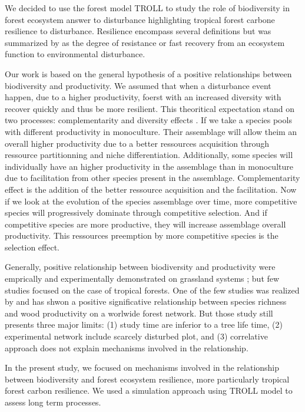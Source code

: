 \documentclass[12pt,]{article}
\theoremstyle{definition}
\theoremstyle{definition}
\theoremstyle{remark}
\begin{document}
We decided to use the forest model TROLL to study the role of
biodiversity in forest ecosystem answer to disturbance highlighting
tropical forest carbone resilience to disturbance. Resilience encompass
several definitions but was summarized by \citet{Oliver2015} as the
degree of resistance or fast recovery from an ecosystem function to
environmental disturbance.

Our work is based on the general hypothesis of a positive relationships
between biodiversity and productivity. We assumed that when a
disturbance event happen, due to a higher productivity, foerst with an
increased diversity with recover quickly and thus be more resilient.
This theoritical expectation stand on two processes: complementarity and
diversity effects \citep{Loreau2001}. If we take a species pools with
different productivity in monoculture. Their assemblage will allow theim
an overall higher productivity due to a better ressources acquisition
through ressource partitionning and niche differentiation. Additionally,
some species will individually have an higher productivity in the
assemblage than in monoculture due to facilitation from other species
present in the assemblage. Complementarity effect is the addition of the
better ressource acquisition and the facilitation. Now if we look at the
evolution of the species assemblage over time, more competitive species
will progressively dominate through competitive selection. And if
competitive species are more productive, they will increase assemblage
overall productivity. This ressources preemption by more competitive
species is the selection effect.

Generally, positive relationship between biodiversity and productivity
were emprically and experimentally demonstrated on grassland systems
\citep{Hooper2005a, Loreau2001a, Naeem2002}; but few studies focused on
the case of tropical forests. One of the few studies was realized by
\citet{Chisholm2013} and has shwon a positive significative relationship
between species richness and wood productivity on a worlwide forest
network. But those study still presents three major limits: (1) study
time are inferior to a tree life time, (2) experimental network include
scarcely disturbed plot, and (3) correlative approach does not explain
mechanisms involved in the relationship.

In the present study, we focused on mechanisms involved in the
relationship between biodiversity and forest ecosystem resilience, more
particularly tropical forest carbon resilience. We used a simulation
approach using TROLL model to assess long term processes.
\end{document}
